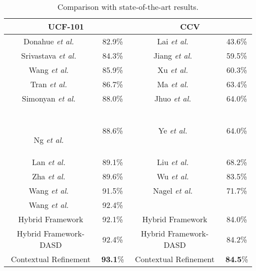 \documentclass[journal]{IEEEtran}
\makeatletter
\newcommand*{\etal}{\emph{et al.}\@\xspace}
\makeatother
\begin{document}
\begin{table}[t!]
\begin{center}
\caption{\label{tbl:comparison} Comparison with state-of-the-art results.}
\begin{tabular}{|c|c||c|c|} 
\hline
\multicolumn{2}{|c||}{UCF-101}                &    \multicolumn{2}{c|}{CCV}        \\ \hline \hline

Donahue \etal~\cite{Donahue2015}  & 82.9\%         & Lai \etal~\cite{Lai2014} & 43.6\%\\ 

Srivastava \etal~\cite{Srivastava2015} 
                                             & 84.3\%         & Jiang \etal~\cite{icmr11:consumervideo} & 59.5\% \\
                                             
Wang \etal~\cite{wang2013action}                        & 85.9\%         & Xu \etal~\cite{xu2013feature}    & 60.3\% \\ 
Tran \etal~\cite{Tran2015}                         & 86.7\%        & Ma \etal~\cite{DBLP:journals/ijcv/MaY14}   & 63.4\% \\ 
Simonyan \etal~\cite{DBLP:conf/nips/SimonyanZ14}            & 88.0\%         & Jhuo \etal~\cite{MVA:audiovisual} & 64.0\%\\\ 

Ng \etal~\cite{Ng2015}                       & 88.6\%      & Ye \etal~\cite{ye2012robust}      & 64.0\% \\ 
Lan \etal~\cite{lan2014beyond}                        & 89.1\%         & Liu \etal~\cite{liu2013sample}    & 68.2\% \\ 
Zha \etal~\cite{Zha2015}                    & 89.6\%         & Wu \etal~\cite{Wu2015}   & 83.5\% \\ 
Wang \etal~\cite{Wang2015}                        & 91.5\%         & Nagel \etal~\cite{Nagel2015}           &  71.7\% \\ 
Wang \etal~\cite{Wang2016}			& 92.4\%		& & \\ \hline \hline





Hybrid Framework  &  92.1\% & Hybrid Framework &  84.0\% \\ \hline
Hybrid Framework-DASD &  92.4\% & Hybrid Framework-DASD &  84.2\% \\ \hline
Contextual Refinement  &  {\bf 93.1}\% & Contextual Refinement &  {\bf 84.5}\% \\ \hline

\end{tabular}
\label{tb:comparison}
\end{center}
\vspace{-0.2in}
\end{table}
\end{document}
